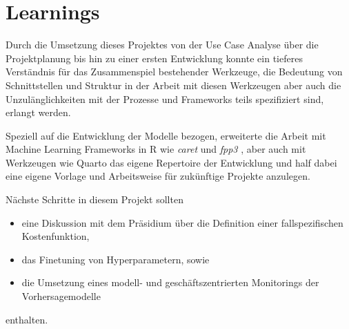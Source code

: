 \section{Learnings}
\label{learned}

Durch die Umsetzung dieses Projektes von der Use Case Analyse über die Projektplanung bis hin zu einer ersten Entwicklung konnte ein tieferes Verständnis für das Zusammenspiel bestehender Werkzeuge, die Bedeutung von Schnittstellen und Struktur in der Arbeit mit diesen Werkzeugen aber auch die Unzulänglichkeiten mit der Prozesse und Frameworks teils spezifiziert sind, erlangt werden. 

Speziell auf die Entwicklung der Modelle bezogen, erweiterte die Arbeit mit Machine Learning Frameworks in R wie \textit{caret} \citep{kuhn_caret_2019} und \textit{fpp3} \citep{hyndman_forecasting_2021}, aber auch mit Werkzeugen wie Quarto \citep{posit_quarto_2025} das eigene Repertoire der Entwicklung und half dabei eine eigene Vorlage und Arbeitsweise für zukünftige Projekte anzulegen.

Nächste Schritte in diesem Projekt sollten 

\begin{itemize}
 \itemsep-8pt
 \item eine Diskussion mit dem Präsidium über die Definition einer fallspezifischen Kostenfunktion,
 \item das Finetuning von Hyperparametern, sowie
 \item die Umsetzung eines modell- und geschäftszentrierten Monitorings der Vorhersagemodelle 
\end{itemize}

enthalten.








